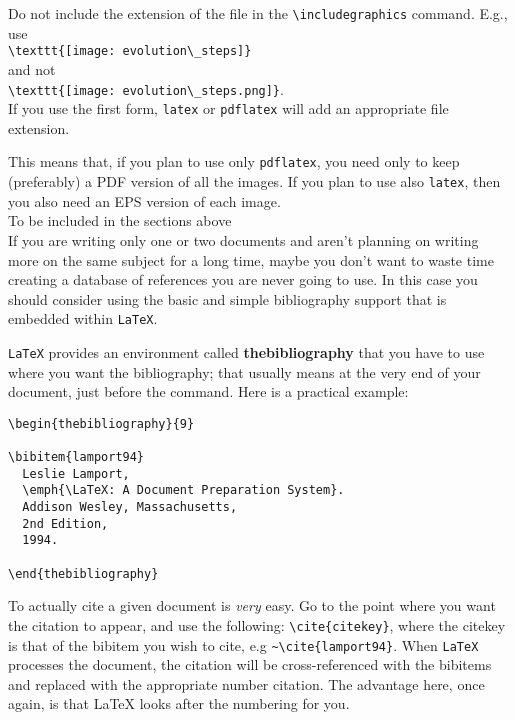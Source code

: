 Do not include the extension of the file in the \verb!\includegraphics! command. E.g., use\\
\verb!\texttt{[image: evolution\_steps]}!\\
and not\\
\verb!\texttt{[image: evolution\_steps.png]}!.\\
If you use the first form, \verb!latex! or \verb!pdflatex! will add an appropriate file extension.

This means that, if you plan to use only \verb!pdflatex!, you need only to keep (preferably) a PDF version of all the images. If you plan to use also \verb!latex!, then you also need an EPS version of each image.\\


{\Large To be included in the sections above} \\

If you are writing only one or two documents and aren't planning on writing more on the same subject for a long time, maybe you don't want to waste time creating a database of references you are never going to use. In this case you should consider using the basic and simple bibliography support that is embedded within \texttt{LaTeX}.

\texttt{LaTeX} provides an environment called \textbf{thebibliography} that you have to use where you want the bibliography; that usually means at the very end of your document, just before the \verb!! command. Here is a practical example:

\begin{verbatim}
\begin{thebibliography}{9}

\bibitem{lamport94}
  Leslie Lamport,
  \emph{\LaTeX: A Document Preparation System}.
  Addison Wesley, Massachusetts,
  2nd Edition,
  1994.

\end{thebibliography}
\end{verbatim}

To actually cite a given document is \textit{very} easy. Go to the point where you want the citation to appear, and use the following: \verb!\cite{citekey}!, where the citekey is that of the bibitem you wish to cite, e.g \verb!~\cite{lamport94}!.  When \texttt{LaTeX} processes the document, the citation will be cross-referenced with the bibitems and replaced with the appropriate number citation. The advantage here, once again, is that LaTeX looks after the numbering for you.

